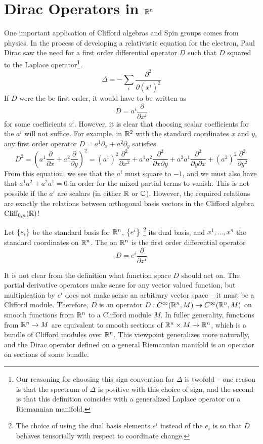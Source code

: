 %
\section{Dirac Operators in $\mathbb{R}^n$}
%
One important application of Clifford algebras and Spin groups comes from
physics. In the process of developing a relativistic equation for the electron,
Paul Dirac saw the need for a first order differential operator $D$ such
that $D$ squared to the Laplace operator\footnote{Our reasoning for choosing this sign
convention for $\Delta$ is twofold -- one reason is that the spectrum of $\Delta$
is positive with this choice of sign, and the second is that this definition
coincides with a generalized Laplace operator on a Riemannian manifold.}.
\[
\Delta = -\sum_i \frac{\partial^2}{\partial(x^i)^2}
\]
If $D$ were the be first order, it would have to be written as
\[
D = a^i \frac{\partial}{\partial x^i}
\]
for some coefficients $a^i$. However, it is clear that choosing scalar coefficients
for the $a^i$ will not suffice. For example, in $\mathbb{R}^2$ with the standard coordinates
$x$ and $y$, any first order operator $D = a^1\partial_x + a^2\partial_y$ satisfies
\[
D^2 = \left(a^1\frac{\partial}{\partial x} + a^2\frac{\partial}{\partial y}\right)^2
= (a^1)^2\frac{\partial^2}{\partial x^2} + a^1a^2\frac{\partial^2}{\partial x \partial y}
+ a^2a^1 \frac{\partial^2}{\partial y \partial x} + (a^2)^2 \frac{\partial^2}{\partial y^2}
\]
From this equation, we see that the $a^i$ must square to $-1$, and we must also
have that $a^1a^2 + a^2a^1 = 0$ in order for the mixed partial terms to vanish.
This is not possible if the $a^i$ are scalars (in either $\mathbb{R}$ or $\mathbb{C}$).
However, the required relations are exactly the relations between orthogonal
basis vectors in the Clifford algebra $\operatorname{Cliff}_{0,n}(\mathbb{R})$!
%
\begin{defn}
Let $\left\lbrace e_i \right\rbrace$ be the standard basis for $\mathbb{R}^n$, $\left\lbrace e^i \right\rbrace$
\footnote{The choice of using the dual basis elements $e^i$ instead of the
$e_i$ is so that $D$ behaves tensorially with respect to coordinate change.}
its dual basis, and $x^1, \ldots ,x^n$ the standard coordinates on $\mathbb{R}^n$.
The  on $\mathbb{R}^n$ is the first order differential operator
\[
D = e^i\frac{\partial}{\partial x^i}
\]
\end{defn}
%
It is not clear from the definition what function space $D$ should act on.
The partial derivative operators make sense for any vector valued function, but
multiplcation by $e^i$ does not make sense an arbitrary vector space -- it must
be a Clifford module. Therefore, $D$ is an operator
$D: C^\infty(\mathbb{R}^n, M) \to C^\infty(\mathbb{R}^n, M)$ on smooth functions from $\mathbb{R}^n$
to a Clifford module $M$. In fuller generality, functions from $\mathbb{R}^n \to M$
are equivalent to smooth sections of $\mathbb{R}^n \times M \to \mathbb{R}^n$, which is a bundle
of Clifford modules over $\mathbb{R}^n$. This viewpoint generalizes more naturally,
and the Dirac operator defined on a general Riemannian manifold is an operator
on sections of some bundle. \\


